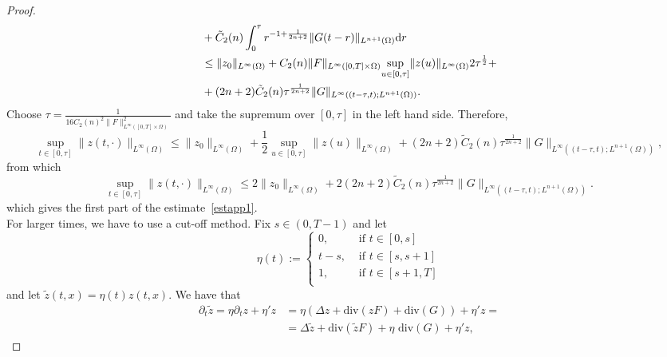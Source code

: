 \documentclass[10pt,a4paper,nouppercase,nowrite]{article}
\numberwithin{equation}{section}
\newcommand{\di}{{\rm d}}
\theoremstyle{definition}
\begin{document}
\begin{proof}
\begin{equation*}
\begin{split}
			&+ \tilde C_2(n) \int_0^{\tau} r^{-1+\frac{1}{2n+2}} \| G(t-r) \|_{L^{n+1}(\Omega)} \di r \\
			&\le \| z_0 \|_{L^{\infty}(\Omega)} + C_2(n) \| F \|_{L^{\infty}([0,T] \times \Omega)} \underset{u \in [0,\tau]}{\sup} \| z(u) \|_{L^{\infty}(\Omega)} 2\tau^{\frac{1}{2}} + \\
			&+(2n+2) \tilde C_2 (n)\tau^{\frac{1}{2n+2}} \| G \|_{L^{\infty}((t-\tau,t);L^{n+1}(\Omega))}.
			\end{split}
		\end{equation*}
		Choose $\tau=\frac{1}{16 C_2(n)^2 \| F \|^2_{L^{\infty}([0,T] \times \Omega)}}$ and take the supremum over $[0,\tau]$ in the left hand side. Therefore,
		\begin{equation*}
			\underset{t \in [0,\tau]}{\sup} \| z(t,\cdot) \|_{L^{\infty}(\Omega)} \le \| z_0 \|_{L^{\infty}(\Omega)} + \frac{1}{2} \underset{u \in [0,\tau]}{\sup} \| z(u) \|_{L^{\infty}(\Omega)} +(2n+2) \tilde C_2(n) \tau^{\frac{1}{2n+2}} \| G \|_{L^{\infty}((t-\tau,t);L^{n+1}(\Omega))},
		\end{equation*}
		from which
		\begin{equation*}
			\underset{t \in [0,\tau]}{\sup} \| z(t,\cdot) \|_{L^{\infty}(\Omega)} \le 2 \| z_0 \|_{L^{\infty}(\Omega)} + 2 (2n+2) \tilde C_2(n) \tau^{\frac{1}{2n+2}} \| G \|_{L^{\infty}((t-\tau,t);L^{n+1}(\Omega))}.
		\end{equation*}
		which gives the first part of the estimate~\eqref{estapp1}. \\
		For larger times, we have to use a cut-off method. Fix $s \in (0,T-1)$ and let
		\begin{equation*}
			\eta(t):=
			\begin{cases}
				0,& \text{ if } t \in [0,s] \\
				t-s,& \text{ if } t \in [s,s+1] \\
				1,& \text{ if } t \in [s+1,T] \\ 
			\end{cases}
		\end{equation*}
		and let $\tilde{z}(t,x)=\eta(t) z(t,x)$. We have that
		\begin{equation*}
			\begin{split}
				\partial_t \tilde{z}= \eta \partial_t z + \eta' z &= \eta (\Delta z + \text{div}(zF) + \text{div}(G)) + \eta' z = \\
				&= \Delta \tilde{z} + \text{div} (\tilde{z}F) + \eta \text{ div}(G) +  \eta' z,
			\end{split}

\end{equation*}
\end{proof}
\end{document}
